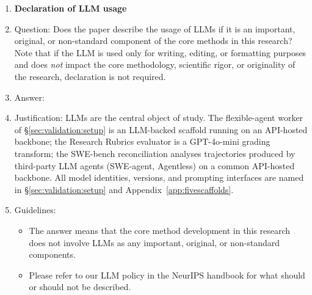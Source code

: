 \begin{enumerate}
\item {\bf Declaration of LLM usage}
    \item[] Question: Does the paper describe the usage of LLMs if it is an important, original, or non-standard component of the core methods in this research? Note that if the LLM is used only for writing, editing, or formatting purposes and does \emph{not} impact the core methodology, scientific rigor, or originality of the research, declaration is not required.
    \item[] Answer: \answerYes{}
    \item[] Justification: LLMs are the central object of study. The flexible-agent worker of \S\ref{sec:validation:setup} is an LLM-backed scaffold running on an API-hosted backbone; the Research Rubrics evaluator is a GPT-4o-mini grading transform; the SWE-bench reconciliation analyses trajectories produced by third-party LLM agents (SWE-agent, Agentless) on a common API-hosted backbone. All model identities, versions, and prompting interfaces are named in \S\ref{sec:validation:setup} and Appendix~\ref{app:fivescaffolds}.
    \item[] Guidelines:
    \begin{itemize}
        \item The answer \answerNA{} means that the core method development in this research does not involve LLMs as any important, original, or non-standard components.
        \item Please refer to our LLM policy in the NeurIPS handbook for what should or should not be described.
    \end{itemize}

\end{enumerate}
